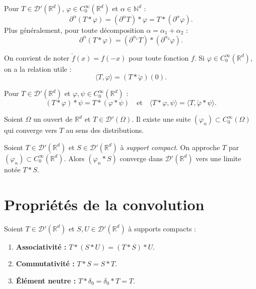 \documentclass[12pt,a4paper,openany]{book}
\theoremstyle{definition}
\theoremstyle{plain}
\theoremstyle{remark}
\begin{document}
	\begin{proposition}
		Pour $T \in \mathcal{D}'(\mathbb{R}^d)$, $\varphi \in C_0^\infty(\mathbb{R}^d)$ et $\alpha \in \mathbb{N}^d$ :
		\[
		\partial^\alpha(T * \varphi) = (\partial^\alpha T) * \varphi = T * (\partial^\alpha \varphi).
		\]
		Plus généralement, pour toute décomposition $\alpha = \alpha_1 + \alpha_2$ :
		\[
		\partial^\alpha(T * \varphi) = (\partial^{\alpha_1} T) * (\partial^{\alpha_2} \varphi).
		\]
	\end{proposition}
	
	On convient de noter $\check{f}(x) = f(-x)$ pour toute fonction $f$. Si $\varphi \in C_0^\infty(\mathbb{R}^d)$, on a la relation utile :
	\[
	\langle T, \varphi \rangle = (T * \check{\varphi})(0).
	\]
	
	\begin{proposition}
		Pour $T \in \mathcal{D}'(\mathbb{R}^d)$ et $\varphi, \psi \in C_0^\infty(\mathbb{R}^d)$ :
		\[
		(T * \varphi) * \psi = T * (\varphi * \psi) \quad \text{et} \quad \langle T * \varphi, \psi \rangle = \langle T, \check{\varphi} * \psi \rangle.
		\]
	\end{proposition}
	
	\begin{theorem}
		Soient $\Omega$ un ouvert de $\mathbb{R}^d$ et $T \in \mathcal{D}'(\Omega)$. Il existe une suite $(\varphi_n) \subset C_0^\infty(\Omega)$ qui converge vers $T$ au sens des distributions.
	\end{theorem}
	
	\begin{definition}
		Soient $T \in \mathcal{D}'(\mathbb{R}^d)$ et $S \in \mathcal{D}'(\mathbb{R}^d)$ à \emph{support compact}. On approche $T$ par $(\varphi_n) \subset C_0^\infty(\mathbb{R}^d)$. Alors $(\varphi_n * S)$ converge dans $\mathcal{D}'(\mathbb{R}^d)$ vers une limite notée $T * S$.
	\end{definition}
	
	\section{Propriétés de la convolution}
	
	\begin{proposition}
		Soient $T \in \mathcal{D}'(\mathbb{R}^d)$ et $S, U \in \mathcal{D}'(\mathbb{R}^d)$ à supports compacts :
		\begin{enumerate}[label=(\arabic*)]
			\item \textbf{Associativité :} $T * (S * U) = (T * S) * U$.
			\item \textbf{Commutativité :} $T * S = S * T$.
			\item \textbf{Élément neutre :} $T * \delta_0 = \delta_0 * T = T$.
		\end{enumerate}
	\end{proposition}
	
\end{document}
